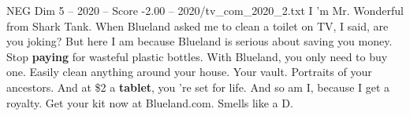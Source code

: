 \begin{textsample}{NEG Dim 5 – 2020 – Score -2.00 – 2020/tv\_com\_2020\_2.txt}  \label{ex:f5_neg_062}
I 'm Mr.
Wonderful from Shark Tank.
When Blueland asked me to clean a toilet on TV, I said, are you joking?
But here I am because Blueland is serious about saving you money.
Stop \textbf{paying} for wasteful plastic bottles.
With Blueland, you only need to buy one.
Easily clean anything around your house.
Your vault.
Portraits of your ancestors.
And at \$2 a \textbf{tablet}, you 're set for life.
And so am I, because I get a royalty.
Get your kit now at Blueland.com.
Smells like a D.

\end{textsample}
